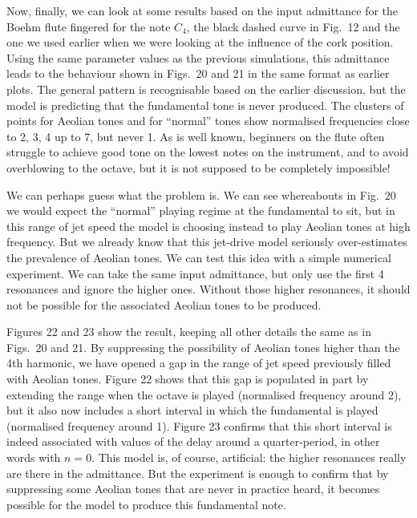   Now, finally, we can look at some results based on the input admittance for 
  the Boehm flute fingered for the note $C_4$, the black dashed curve in Fig.\ 
  12 and the one we used earlier when we were looking at the influence of the 
  cork position. Using the same parameter values as the previous simulations, 
  this admittance leads to the behaviour shown in Figs.\ 20 and 21 in the same 
  format as earlier plots. The general pattern is recognisable based on the 
  earlier discussion, but the model is predicting that the fundamental tone is 
  never produced. The clusters of points for Aeolian tones and for “normal” 
  tones show normalised frequencies close to 2, 3, 4 up to 7, but never 1. As 
  is well known, beginners on the flute often struggle to achieve good tone on 
  the lowest notes on the instrument, and to avoid overblowing to the octave, 
  but it is not supposed to be completely impossible! 

  We can perhaps guess what the problem is. We can see whereabouts in Fig.\ 20 
  we would expect the “normal” playing regime at the fundamental to sit, but in 
  this range of jet speed the model is choosing instead to play Aeolian tones 
  at high frequency. But we already know that this jet-drive model seriously 
  over-estimates the prevalence of Aeolian tones. We can test this idea with a 
  simple numerical experiment. We can take the same input admittance, but only 
  use the first 4 resonances and ignore the higher ones. Without those higher 
  resonances, it should not be possible for the associated Aeolian tones to be 
  produced. 

  Figures 22 and 23 show the result, keeping all other details the same as in 
  Figs.\ 20 and 21. By suppressing the possibility of Aeolian tones higher than 
  the 4th harmonic, we have opened a gap in the range of jet speed previously 
  filled with Aeolian tones. Figure 22 shows that this gap is populated in part 
  by extending the range when the octave is played (normalised frequency around 
  2), but it also now includes a short interval in which the fundamental is 
  played (normalised frequency around 1). Figure 23 confirms that this short 
  interval is indeed associated with values of the delay around a 
  quarter-period, in other words with $n=0$. This model is, of course, 
  artificial: the higher resonances really are there in the admittance. But the 
  experiment is enough to confirm that by suppressing some Aeolian tones that 
  are never in practice heard, it becomes possible for the model to produce 
  this fundamental note. 

